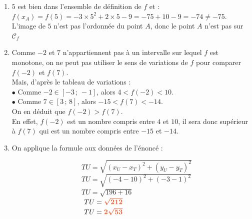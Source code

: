 \documentclass[a4paper,11pt]{article}
\begin{document}
\newpage \begin{seance}{} %

\begin{enumerate}
\item   $5$ est bien dans l'ensemble de définition de $f$ et :\\ 
                $f(x_A)=f(5)=-3\times 5^2+2\times5-9
                =-75+10-9=-74\neq-75$.\\
                L'image de $5$ n'est pas l'ordonnée du point $A$, donc le point $A$ n'est pas sur $\mathscr{C}_f$
                
\item  Comme $-2$ et $7$ n'appartiennent pas à un intervalle sur lequel $f$ est monotone, on ne peut pas utiliser le sens de variations de $f$ pour comparer $f(-2)$ et $f(7)$.\\
                Mais, d'après le tableau de variations :\\
                $\bullet$ Comme $-2\in [-3\,;\,-1]$, alors $4 < f(-2) < 10$. \\
                $\bullet$ Comme $7\in [3\,;\,8]$, alors $-15 < f(7) < -14$. \\
                On en déduit que {\bfseries \color[HTML]{f15929}$f(-2) > f(7)$}.\\
                En effet, $f(-2)$ est un nombre compris entre  $4$ et $10$, il sera donc supérieur à  $f(7)$ qui est un nombre compris entre $-15$ et $-14$.

\item On applique la formule aux données de l'énoncé :

\medskip
$\phantom{On applique la formule  : } TU=\sqrt{\left(x_U-x_T\right)^{2}+\left(y_U-y_T\right)^{2}}$\\$\phantom{On applique la formule  : }TU=\sqrt{\left(-4-10\right)^{2}+\left(-3-1\right)^{2}}$\\$\phantom{On applique la formule :        } TU=\sqrt{196+16}$\\$\phantom{On applique la formule  :        } TU={\color[HTML]{f15929}\boldsymbol{\sqrt{212}}}$\\$\phantom{On applique la formule  :     } TU={\color[HTML]{f15929}\boldsymbol{2\sqrt{53}}}$\\


\end{enumerate}
\end{seance}
\end{document}
